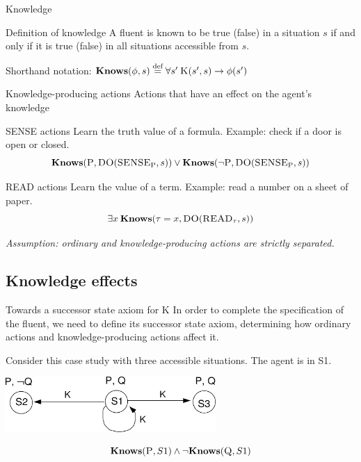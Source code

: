 \begin{frame}{Knowledge}
    \begin{block}{Definition of knowledge}
        A fluent is known to be true (false) in a situation \(s\)
        if and only if it is true (false)
        in all situations accessible from \(s\).
    \end{block}

    Shorthand notation: \( \textbf{Knows}(\phi, s) \stackrel{\text{def}}{=} \forall s' \: \textsc{K}(s',s) \rightarrow \phi(s') \)
\end{frame}

\begin{frame}{Knowledge-producing actions}
    Actions that have an effect on the agent's knowledge

    \begin{block}{SENSE actions}
        Learn the truth value of a formula. Example: check if a door is open or closed.
        \[
            \textbf{Knows}(\textsc{P}, \textsc{DO}(\textsc{SENSE}_\text{P}, s))
            \lor
            \textbf{Knows}(\lnot \textsc{P}, \textsc{DO}(\textsc{SENSE}_\text{P}, s))
        \]
    \end{block}

    \begin{block}{READ actions}
        Learn the value of a term. Example: read a number on a sheet of paper.
        \[
            \exists x \: \textbf{Knows}(\tau = x, \textsc{DO}(\textsc{READ}_\tau, s))
        \]
    \end{block}

    \emph{Assumption: ordinary and knowledge-producing actions are strictly separated.}
\end{frame}

\subsection{Knowledge effects}

\begin{frame}{Towards a successor state axiom for K}
    In order to complete the specification of the  fluent,
    we need to define its successor state axiom,
    determining how ordinary actions and knowledge-producing actions affect it.

    Consider this case study with three accessible situations. The agent is in S1.

    \begin{center}
        \includegraphics[width=0.6\textwidth]{assets/3states_noactions.png}
    \end{center}

    \[ \textbf{Knows}(\textsc{P}, S1) \land \lnot \textbf{Knows}(\textsc{Q}, S1) \]
\end{frame}

